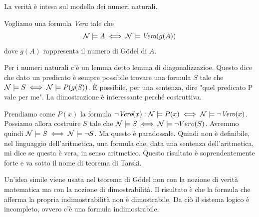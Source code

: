 La verità è intesa sul modello dei numeri naturali.

Vogliamo una formula \textit{Vera} tale che
\begin{equation*}
    \mathcal{N} \models A \iff \mathcal{N} \models \textit{Vera}(g(A))
\end{equation*}
dove $g(A)$ rappresenta il numero di Gödel di $A$.

Per i numeri naturali c'è un lemma detto lemma di diagonalizzazioe. Questo dice che dato un
predicato è sempre possibile trovare una formula $S$ tale che $\mathcal{N} \models S \iff \mathcal{N} \models
P(g(S))$. È possibile, per una sentenza, dire "quel predicato P vale per me". La dimostrazione è
interessante perché costruttiva.

Prendiamo come $P(x)$ la formula $\lnot \textit{Vero}(x): \mathcal{N} \models P(x) \iff \mathcal{N} \models
\lnot \textit{Vero}(x)$. Possiamo allora costruire $S$ tale che $\mathcal{N} \models S \iff \mathcal{N}
\models \lnot Vero (S)$. Avremmo quindi $\mathcal{N} \models S \iff \mathcal{N} \models \lnot S$. Ma questo è
paradossale.  Quindi non è definibile, nel linguaggio dell'aritmetica, una formula che, data una
sentenza dell'aritmetica, mi dice se questa è vera, in senso aritmetico. Questo risultato è
soprendentemente forte e va sotto il nome di teorema di Tarski.

Un'idea simile viene usata nel teorema di Gödel non con la nozione di verità matematica ma con la
nozione di dimostrabilità. Il risultato è che la formula che afferma la propria indimostrabilità
non è dimostrabile. Da ciò il sistema logico è incompleto, ovvero c'è una formula indimostrabile.
